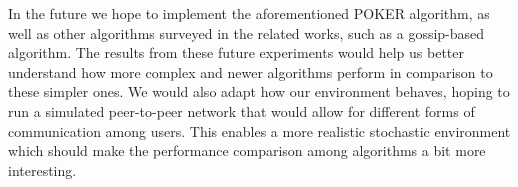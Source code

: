 \documentclass{article}
\begin{document}
In the future we hope to implement the aforementioned POKER algorithm, as well as other algorithms surveyed in the related works, such as a gossip-based algorithm. The 
results from these future experiments would help us better understand how more complex and newer algorithms perform in comparison to these simpler ones. We would also adapt 
how our environment behaves, hoping to run a simulated peer-to-peer network that would allow for different forms of communication among users. This enables a more realistic 
stochastic environment which should make the performance comparison among algorithms a bit more interesting. 



\end{document}
